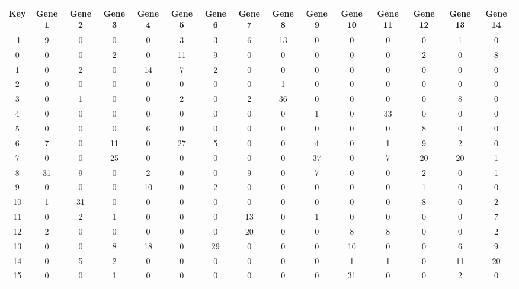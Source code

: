 \begin{tabular}{|c|c|c|c|c|c|c|c|c|c|c|c|c|c|c|}
\hline
Key & Gene 1 & Gene 2 & Gene 3 & Gene 4 & Gene 5 & Gene 6 & Gene 7 & Gene 8 & Gene 9 & Gene 10 & Gene 11 & Gene 12 & Gene 13 & Gene 14 \\
\hline
-1 & 9 & 0 & 0 & 0 & 3 & 3 & 6 & 13 & 0 & 0 & 0 & 0 & 1 & 0 \\
0 & 0 & 0 & 2 & 0 & 11 & 9 & 0 & 0 & 0 & 0 & 0 & 2 & 0 & 8 \\
1 & 0 & 2 & 0 & 14 & 7 & 2 & 0 & 0 & 0 & 0 & 0 & 0 & 0 & 0 \\
2 & 0 & 0 & 0 & 0 & 0 & 0 & 0 & 1 & 0 & 0 & 0 & 0 & 0 & 0 \\
3 & 0 & 1 & 0 & 0 & 2 & 0 & 2 & 36 & 0 & 0 & 0 & 0 & 8 & 0 \\
4 & 0 & 0 & 0 & 0 & 0 & 0 & 0 & 0 & 1 & 0 & 33 & 0 & 0 & 0 \\
5 & 0 & 0 & 0 & 6 & 0 & 0 & 0 & 0 & 0 & 0 & 0 & 8 & 0 & 0 \\
6 & 7 & 0 & 11 & 0 & 27 & 5 & 0 & 0 & 4 & 0 & 1 & 9 & 2 & 0 \\
7 & 0 & 0 & 25 & 0 & 0 & 0 & 0 & 0 & 37 & 0 & 7 & 20 & 20 & 1 \\
8 & 31 & 9 & 0 & 2 & 0 & 0 & 9 & 0 & 7 & 0 & 0 & 2 & 0 & 1 \\
9 & 0 & 0 & 0 & 10 & 0 & 2 & 0 & 0 & 0 & 0 & 0 & 1 & 0 & 0 \\
10 & 1 & 31 & 0 & 0 & 0 & 0 & 0 & 0 & 0 & 0 & 0 & 8 & 0 & 2 \\
11 & 0 & 2 & 1 & 0 & 0 & 0 & 13 & 0 & 1 & 0 & 0 & 0 & 0 & 7 \\
12 & 2 & 0 & 0 & 0 & 0 & 0 & 20 & 0 & 0 & 8 & 8 & 0 & 0 & 2 \\
13 & 0 & 0 & 8 & 18 & 0 & 29 & 0 & 0 & 0 & 10 & 0 & 0 & 6 & 9 \\
14 & 0 & 5 & 2 & 0 & 0 & 0 & 0 & 0 & 0 & 1 & 1 & 0 & 11 & 20 \\
15 & 0 & 0 & 1 & 0 & 0 & 0 & 0 & 0 & 0 & 31 & 0 & 0 & 2 & 0 \\
\hline
\end{tabular}